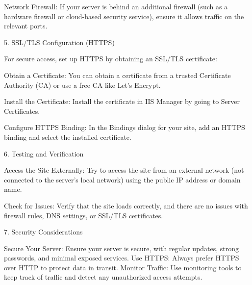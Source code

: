     Network Firewall:
        If your server is behind an additional firewall (such as a hardware firewall or cloud-based security service), ensure it allows traffic on the relevant ports.

5. SSL/TLS Configuration (HTTPS)

For secure access, set up HTTPS by obtaining an SSL/TLS certificate:

    Obtain a Certificate:
        You can obtain a certificate from a trusted Certificate Authority (CA) or use a free CA like Let's Encrypt.

    Install the Certificate:
        Install the certificate in IIS Manager by going to Server Certificates.

    Configure HTTPS Binding:
        In the Bindings dialog for your site, add an HTTPS binding and select the installed certificate.

6. Testing and Verification

    Access the Site Externally:
        Try to access the site from an external network (not connected to the server's local network) using the public IP address or domain name.

    Check for Issues:
        Verify that the site loads correctly, and there are no issues with firewall rules, DNS settings, or SSL/TLS certificates.

7. Security Considerations

    Secure Your Server: Ensure your server is secure, with regular updates, strong passwords, and minimal exposed services.
    Use HTTPS: Always prefer HTTPS over HTTP to protect data in transit.
    Monitor Traffic: Use monitoring tools to keep track of traffic and detect any unauthorized access attempts.